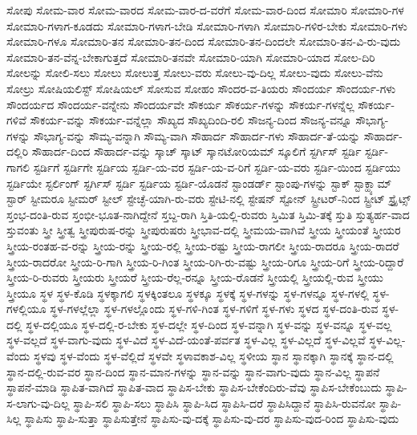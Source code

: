 {ಸೋಪು
ಸೋಮ-ವಾರ
ಸೋಮ-ವಾರದ
ಸೋಮ-ವಾರ-ದ-ವರೆಗೆ
ಸೋಮ-ವಾರ-ದಿಂದ
ಸೋಮಾರಿ
ಸೋಮಾರಿ-ಗಳ
ಸೋಮಾರಿ-ಗಳಾಗ-ಕೂಡದು
ಸೋಮಾರಿ-ಗಳಾಗ-ಬೇಡಿ
ಸೋಮಾರಿ-ಗಳಾಗಿ
ಸೋಮಾರಿ-ಗಳಿರ-ಬೇಕು
ಸೋಮಾರಿ-ಗಳು
ಸೋಮಾರಿ-ಗಳೂ
ಸೋಮಾರಿ-ತನ
ಸೋಮಾರಿ-ತನ-ದಿಂದ
ಸೋಮಾರಿ-ತನ-ದಿಂದಲೇ
ಸೋಮಾರಿ-ತನ-ವಿ-ರು-ವುದು
ಸೋಮಾರಿ-ತನ-ವೆನ್ನ-ಬೇಕಾಗುತ್ತದೆ
ಸೋಮಾರಿ-ತನವೇ
ಸೋಮಾರಿ-ಯಾಗಿ
ಸೋಮಾರಿ-ಯಾದ
ಸೋಲ-ದಿರಿ
ಸೋಲನ್ನು
ಸೋಲಿ-ಸಲು
ಸೋಲು
ಸೋಲುತ್ತ
ಸೋಲು-ವರು
ಸೋಲು-ವು-ದಿಲ್ಲ
ಸೋಲು-ವುದು
ಸೋಲು-ವೆನು
ಸೋಲ್ರು
ಸೋಷಿಯಲಿಸ್ಟ್
ಸೋಷಿಯಲ್
ಸೋಸುವ
ಸೋಹಂ
ಸೌಂದರ-ವ-ತಿಯರು
ಸೌಂದರ್ಯ
ಸೌಂದರ್ಯ-ಗಳು
ಸೌಂದರ್ಯದ
ಸೌಂದರ್ಯ-ವನ್ನೇನು
ಸೌಂದರ್ಯವೇ
ಸೌಕರ್ಯ
ಸೌಕರ್ಯ-ಗಳನ್ನು
ಸೌಕರ್ಯ-ಗಳನ್ನೆಲ್ಲ
ಸೌಕರ್ಯ-ಗಳಿವೆ
ಸೌಕರ್ಯ-ವನ್ನು
ಸೌಕರ್ಯ-ವನ್ನೆಲ್ಲಾ
ಸೌಖ್ಯದ
ಸೌಖ್ಯದಿಂದಿ-ರಲಿ
ಸೌಜನ್ಯ-ದಿಂದ
ಸೌಜನ್ಯ-ವನ್ನೂ
ಸೌಭಾಗ್ಯ-ಗಳನ್ನು
ಸೌಭಾಗ್ಯ-ವನ್ನು
ಸೌಮ್ಯ-ವನ್ನಾಗಿ
ಸೌಮ್ಯ-ವಾಗಿ
ಸೌಹಾರ್ದ
ಸೌಹಾರ್ದ-ಗಳು
ಸೌಹಾರ್ದ-ತೆ-ಯನ್ನು
ಸೌಹಾರ್ದ-ದಲ್ಲಿರಿ
ಸೌಹಾರ್ದ-ದಿಂದ
ಸೌಹಾರ್ದ-ವನ್ನು
ಸ್ಕಾಚ್
ಸ್ಕಾಟ್
ಸ್ಕಾನಟೋರಿಯಮ್
ಸ್ಕೂಲಿಗೆ
ಸ್ಟರ್ಗಿಸ್
ಸ್ಟರ್ಡಿ
ಸ್ಟರ್ಡಿ-ಗಾಗಲಿ
ಸ್ಟರ್ಡಿಗೆ
ಸ್ಟರ್ಡಿಗೇ
ಸ್ಟರ್ಡಿಯ
ಸ್ಟರ್ಡಿ-ಯ-ವರ
ಸ್ಟರ್ಡಿ-ಯ-ವ-ರಿಗೆ
ಸ್ಟರ್ಡಿ-ಯ-ವರು
ಸ್ಟರ್ಡಿ-ಯಿಂದ
ಸ್ಟರ್ಡಿಯು
ಸ್ಟರ್ಡಿಯೇ
ಸ್ಟರ್ಲಿಂಗ್
ಸ್ಟರ್ಗಿಸ್
ಸ್ಟರ್ಡಿ
ಸ್ಟರ್ಡಿಯ
ಸ್ಟರ್ಡಿ-ಯೊಡನೆ
ಸ್ಟಾಂಡರ್ಡ್
ಸ್ಟಾಂಪು-ಗಳನ್ನು
ಸ್ಟಾಕ್
ಸ್ಟಾಕ್ಹ್ಯಾಮ್
ಸ್ಟಾರ್
ಸ್ಟೀಮರೂ
ಸ್ಟೀಮರ್
ಸ್ಟೀಲ್
ಸ್ಟೇಚ್ಛೆ-ಯಾಗಿ-ರು-ವರು
ಸ್ಟೇಟಿ-ನಲ್ಲಿ
ಸ್ಟೇಷನ್
ಸ್ಟೋನ್
ಸ್ಟ್ರೀಟರ್-ನಿಂದ
ಸ್ಟ್ರೀಟ್
ಸ್ಟ್ರೈಟ್ಸ್
ಸ್ತಂಭ-ದಂತಿ-ರುವ
ಸ್ತಂಭೀ-ಭೂತ-ನಾಗಿದ್ದೇನೆ
ಸ್ತಬ್ದ-ರಾಗಿ
ಸ್ತಿತಿ-ಯಲ್ಲಿ-ರುವರು
ಸ್ತಿಮಿತ
ಸ್ತಿಮಿ-ತಕ್ಕೆ
ಸ್ತುತಿ
ಸ್ತುತ್ಯರ್ಹ-ವಾದ
ಸ್ತುವಂತು
ಸ್ತ್ರೀ
ಸ್ತ್ರೀತ್ವ
ಸ್ತ್ರೀಪುರುಷ-ರನ್ನು
ಸ್ತ್ರೀಪುರುಷರು
ಸ್ತ್ರೀಭಾವ-ದಲ್ಲಿ
ಸ್ತ್ರೀಮಯ-ವಾಗಿವೆ
ಸ್ತ್ರೀಯ
ಸ್ತ್ರೀಯಂತೆ
ಸ್ತ್ರೀಯರ
ಸ್ತ್ರೀಯ-ರಂತಹ-ವ-ರನ್ನು
ಸ್ತ್ರೀಯ-ರನ್ನು
ಸ್ತ್ರೀಯ-ರಲ್ಲಿ
ಸ್ತ್ರೀಯ-ರಷ್ಟು
ಸ್ತ್ರೀಯ-ರಾಗಲೀ
ಸ್ತ್ರೀಯ-ರಾದರೂ
ಸ್ತ್ರೀಯ-ರಾದರೆ
ಸ್ತ್ರೀಯ-ರಾದರೋ
ಸ್ತ್ರೀಯ-ರಿ-ಗಾಗಿ
ಸ್ತ್ರೀಯ-ರಿ-ಗಿಂತ
ಸ್ತ್ರೀಯ-ರಿಗಿ-ರು-ವಷ್ಟು
ಸ್ತ್ರೀಯ-ರಿಗೂ
ಸ್ತ್ರೀಯ-ರಿಗೆ
ಸ್ತ್ರೀಯ-ರಿದ್ದಾರೆ
ಸ್ತ್ರೀಯ-ರಿ-ರುವರು
ಸ್ತ್ರೀಯರು
ಸ್ತ್ರೀಯರೆ
ಸ್ತ್ರೀಯ-ರೆಲ್ಲ-ರನ್ನೂ
ಸ್ತ್ರೀಯ-ರೊಡನೆ
ಸ್ತ್ರೀಯಲ್ಲಿ
ಸ್ತ್ರೀಯಲ್ಲಿ-ರುವ
ಸ್ತ್ರೀಯು
ಸ್ತ್ರೀಯೂ
ಸ್ಥಳ
ಸ್ಥಳ-ಕೊಡಿ
ಸ್ಥಳಕ್ಕಾಗಲಿ
ಸ್ಥಳಕ್ಕಿಂತಲೂ
ಸ್ಥಳಕ್ಕೂ
ಸ್ಥಳಕ್ಕೆ
ಸ್ಥಳ-ಗಳನ್ನು
ಸ್ಥಳ-ಗಳನ್ನೂ
ಸ್ಥಳ-ಗಳಲ್ಲಿ
ಸ್ಥಳ-ಗಳಲ್ಲಿಯೂ
ಸ್ಥಳ-ಗಳಲ್ಲೆಲ್ಲಾ
ಸ್ಥಳ-ಗಳಲ್ಲೊಂದು
ಸ್ಥಳ-ಗಳಿ-ಗಿಂತ
ಸ್ಥಳ-ಗಳಿಗೆ
ಸ್ಥಳ-ಗಳು
ಸ್ಥಳದ
ಸ್ಥಳ-ದಂತಿ-ರುವ
ಸ್ಥಳ-ದಲ್ಲಿ
ಸ್ಥಳ-ದಲ್ಲಿಯೂ
ಸ್ಥಳ-ದಲ್ಲಿ-ರ-ಬೇಕು
ಸ್ಥಳ-ದಲ್ಲೇ
ಸ್ಥಳ-ದಿಂದ
ಸ್ಥಳ-ವನ್ನಾಗಿ
ಸ್ಥಳ-ವನ್ನು
ಸ್ಥಳ-ವನ್ನೂ
ಸ್ಥಳ-ವಲ್ಲ
ಸ್ಥಳ-ವಲ್ಲದೆ
ಸ್ಥಳ-ವಾಗು-ವುದು
ಸ್ಥಳ-ವಿದೆ
ಸ್ಥಳ-ವಿದೆ-ಯಂತೆ-ಪರ್ವತ
ಸ್ಥಳ-ವಿಲ್ಲ
ಸ್ಥಳ-ವಿಲ್ಲದೆ
ಸ್ಥಳ-ವಿಲ್ಲವೆ
ಸ್ಥಳ-ವಿಲ್ಲ-ವೆಂದು
ಸ್ಥಳವು
ಸ್ಥಳ-ವೆಂದು
ಸ್ಥಳ-ವೆಲ್ಲಿದೆ
ಸ್ಥಳವೇ
ಸ್ಥಳಾವಕಾಶ-ವಿಲ್ಲ
ಸ್ಥಳೀಯ
ಸ್ಥಾನ
ಸ್ಥಾನಕ್ಕಾಗಿ
ಸ್ಥಾನಕ್ಕೆ
ಸ್ಥಾನ-ದಲ್ಲಿ
ಸ್ಥಾನ-ದಲ್ಲಿ-ರುವ-ವರ
ಸ್ಥಾನ-ದಿಂದ
ಸ್ಥಾನ-ಮಾನ-ಗಳನ್ನು
ಸ್ಥಾನ-ವನ್ನು
ಸ್ಥಾನ-ವಾಗು-ವುದು
ಸ್ಥಾನ-ವಿಲ್ಲ
ಸ್ಥಾಪನೆ
ಸ್ಥಾಪನೆ-ಮಾಡಿ
ಸ್ಥಾಪಿತ-ವಾಗಿದೆ
ಸ್ಥಾಪಿತ-ವಾದ
ಸ್ಥಾಪಿಸ-ಬೇಕು
ಸ್ಥಾಪಿಸ-ಬೇಕೆಂದಿರು-ವೆವು
ಸ್ಥಾಪಿಸ-ಬೇಕೆಂಬುದು
ಸ್ಥಾಪಿ-ಸ-ಲಾಗು-ವು-ದಿಲ್ಲ
ಸ್ಥಾಪಿ-ಸಲಿ
ಸ್ಥಾಪಿ-ಸಲು
ಸ್ಥಾಪಿಸಿ
ಸ್ಥಾಪಿ-ಸಿದ
ಸ್ಥಾಪಿಸಿ-ದರೆ
ಸ್ಥಾಪಿಸಿದ್ದಾನೆ
ಸ್ಥಾಪಿಸಿ-ರುವನೋ
ಸ್ಥಾಪಿ-ಸಿಲ್ಲ
ಸ್ಥಾಪಿಸು
ಸ್ಥಾಪಿ-ಸುತ್ತಾ
ಸ್ಥಾಪಿಸುತ್ತೇನೆ
ಸ್ಥಾಪಿಸು-ವು-ದಕ್ಕೆ
ಸ್ಥಾಪಿಸು-ವು-ದರ
ಸ್ಥಾಪಿಸು-ವುದ-ರಿಂದ
ಸ್ಥಾಪಿಸು-ವುದು
}
